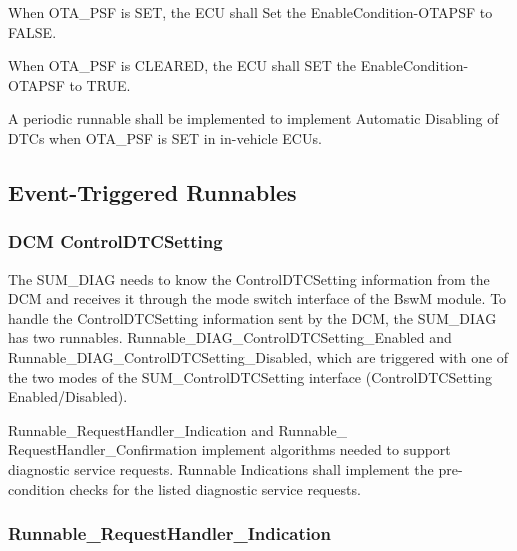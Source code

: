 {
When OTA_PSF is SET, the ECU shall Set the EnableCondition-OTAPSF to FALSE. 
}
{}

{
When OTA_PSF is CLEARED, the ECU shall SET the EnableCondition-OTAPSF to TRUE.
}
{}


{
A periodic runnable shall be implemented to implement Automatic Disabling of DTCs when OTA_PSF is SET in in-vehicle ECUs.
}
{  }




\subsection{Event-Triggered Runnables}
\label{subsec:Event-Triggered_runnables}

\subsubsection{DCM ControlDTCSetting}
\label{subsubsec:DCM_ControlDTCSetting}
The SUM\_DIAG needs to know the ControlDTCSetting information from the DCM and receives it through the mode switch interface of the BswM module. 
To handle the ControlDTCSetting information sent by the DCM, the SUM\_DIAG has two runnables.
Runnable\_DIAG\_ControlDTCSetting\_Enabled and Runnable\_DIAG\_ControlDTCSetting\_Disabled,
which are triggered with one of the two modes of the SUM\_ControlDTCSetting interface (ControlDTCSetting Enabled/Disabled).

{


}
{  }

{
Runnable_RequestHandler_Indication and Runnable_ RequestHandler_Confirmation implement algorithms needed to support diagnostic service requests.
}
{}
{
Runnable Indications shall implement the pre-condition checks for the listed diagnostic service requests. 
}
{}

\subsubsection{Runnable_RequestHandler_Indication}

